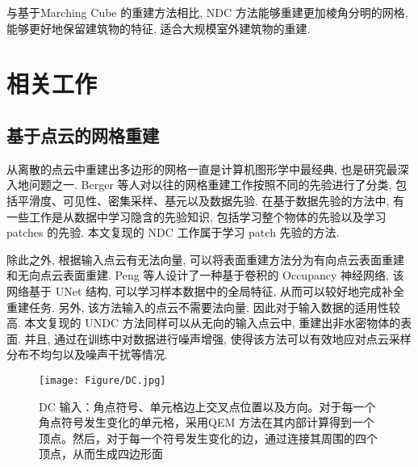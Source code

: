 与基于Marching Cube \cite{lorensen1987marching}的重建方法相比, NDC 方法能够重建更加棱角分明的网格, 能够更好地保留建筑物的特征, 适合大规模室外建筑物的重建. 

\section{相关工作}

\subsection{基于点云的网格重建}
从离散的点云中重建出多边形的网格一直是计算机图形学中最经典, 也是研究最深入地问题之一. Berger 等人\cite{berger2017survey}对以往的网格重建工作按照不同的先验进行了分类, 包括平滑度、可见性、密集采样、基元以及数据先验. 在基于数据先验的方法中, 有一些工作是从数据中学习隐含的先验知识, 包括学习整个物体的先验\cite{peng2021shape}以及学习 patches 的先验\cite{Shen:2012}. 本文复现的 NDC 工作属于学习 patch 先验的方法.

除此之外, 根据输入点云有无法向量, 可以将表面重建方法分为有向点云表面重建\cite{kazhdan2006poisson}和无向点云表面重建\cite{atzmon2020sal}. Peng 等人\cite{tang2021sa}设计了一种基于卷积的 Occupancy 神经网络, 该网络基于 UNet \cite{ronneberger2015u}结构, 可以学习样本数据中的全局特征, 从而可以较好地完成补全重建任务. 另外, 该方法输入的点云不需要法向量, 因此对于输入数据的适用性较高. 本文复现的 UNDC 方法同样可以从无向的输入点云中, 重建出非水密物体的表面. 并且, 通过在训练中对数据进行噪声增强, 使得该方法可以有效地应对点云采样分布不均匀以及噪声干扰等情况. 

\begin{figure}[H]
	\center
	\texttt{[image: Figure/DC.jpg]}
	\centering
	\caption{DC 输入：角点符号、单元格边上交叉点位置以及方向。对于每一个角点符号发生变化的单元格，采用QEM 方法在其内部计算得到一个顶点。然后，对于每一个符号发生变化的边，通过连接其周围的四个顶点，从而生成四边形面}\label{fig:dc}
\end{figure}

